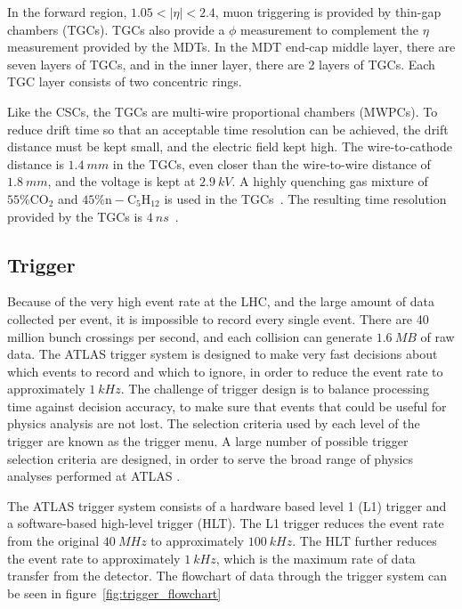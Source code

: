 In the forward region, $1.05 < |\eta| < 2.4$, muon triggering is provided by thin-gap chambers (TGCs).
TGCs also provide a $\phi$ measurement to complement the $\eta$ measurement provided by the MDTs.
In the MDT end-cap middle layer, there are seven layers of TGCs, and in the inner layer, there are 2 layers of TGCs.
Each TGC layer consists of two concentric rings.

Like the CSCs, the TGCs are multi-wire proportional chambers (MWPCs).
To reduce drift time so that an acceptable time resolution can be achieved, the drift distance must be kept small, and the electric field kept high.
The wire-to-cathode distance is $1.4~mm$ in the TGCs, even closer than the wire-to-wire distance of $1.8~mm$, and the voltage is kept at $2.9~kV$.
A highly quenching gas mixture of $55\% \mathrm{CO_2}$ and $45\% \mathrm{n-C_5 H_{12}}$ is used in the TGCs~\cite{atlas-detector-2008}.
The resulting time resolution provided by the TGCs is $4~ns$~\cite{muon-2003}.

\subsection{Trigger}\label{subsec:trigger}

Because of the very high event rate at the LHC, and the large amount of data collected per event, it is impossible to record every single event.
There are 40 million bunch crossings per second, and each collision can generate $1.6~MB$ of raw data.
The ATLAS trigger system is designed to make very fast decisions about which events to record and which to ignore, in order to reduce the event rate to approximately $1~kHz$.
The challenge of trigger design is to balance processing time against decision accuracy, to make sure that events that could be useful for physics analysis are not lost.
The selection criteria used by each level of the trigger are known as the trigger menu.
A large number of possible trigger selection criteria are designed, in order to serve the broad range of physics analyses performed at ATLAS .

The ATLAS trigger system consists of a hardware based level 1 (L1) trigger and a software-based high-level trigger (HLT).
The L1 trigger reduces the event rate from the original $40~MHz$ to approximately $100~kHz$.
The HLT further reduces the event rate to approximately $1~kHz$, which is the maximum rate of data transfer from the detector.
The flowchart of data through the trigger system can be seen in figure~\ref{fig:trigger_flowchart}

